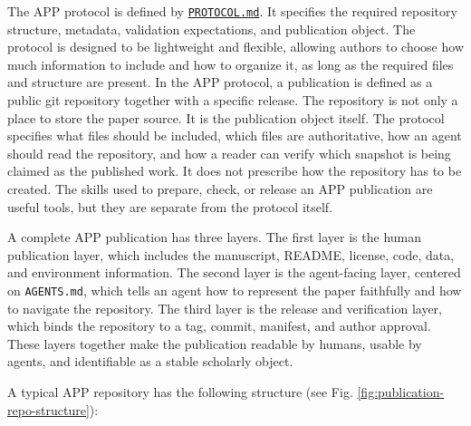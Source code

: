 \documentclass{article}
\begin{document}
The APP protocol is defined by \href{https://github.com/LionSR/AgenticPublicationProtocol/blob/main/PROTOCOL.md}{\texttt{PROTOCOL.md}}. It specifies the required repository structure, metadata, validation expectations, and publication object. The protocol is designed to be lightweight and flexible, allowing authors to choose how much information to include and how to organize it, as long as the required files and structure are present.
In the APP protocol, a publication is defined as a public git repository
together with a specific release. The repository is not only a place to store
the paper source. It is the publication object itself. The protocol specifies
what files should be included, which files are authoritative, how an agent
should read the repository, and how a reader can verify which snapshot is being
claimed as the published work. It does not prescribe how the repository has to
be created. The skills used to prepare, check, or release an APP publication
are useful tools, but they are separate from the protocol itself.

A complete APP publication has three layers. The first layer is the human
publication layer, which includes the manuscript, README, license, code, data,
and environment information. The second layer is the agent-facing layer,
centered on \texttt{AGENTS.md}, which tells an agent how to represent the paper
faithfully and how to navigate the repository. The third layer is the release
and verification layer, which binds the repository to a tag, commit, manifest,
and author approval. These layers together make the publication readable by
humans, usable by agents, and identifiable as a stable scholarly object.

A typical APP repository has the following structure (see Fig. \ref{fig:publication-repo-structure}):
\end{document}
